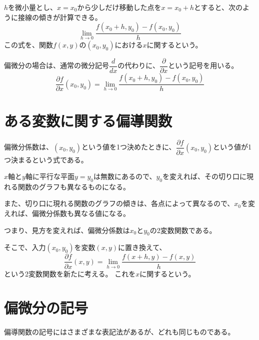 \documentclass[../../../topic_calculus]{subfiles}
\begin{document}
\br

$h$を微小量とし、$x = x_0$から少しだけ移動した点を$x = x_0 + h$とすると、次のように接線の傾きが計算できる。
\begin{equation*}
  \lim_{h \to 0} \frac{f(x_0 + h, y_0) - f(x_0, y_0)}{h}
\end{equation*}
この式を、関数$f(x,y)$の$(x_0,y_0)$における$x$に関するという。

\br

偏微分の場合は、通常の微分記号$\dfrac{d}{dx}$の代わりに、$\dfrac{\partial}{\partial x}$という記号を用いる。
\begin{equation*}
  \dfrac{\partial f}{\partial x}(x_0,y_0) = \lim_{h \to 0} \frac{f(x_0 + h, y_0) - f(x_0, y_0)}{h}
\end{equation*}

\sectionline
\section{ある変数に関する偏導関数}

偏微分係数は、$(x_0,y_0)$という値を1つ決めたときに、$\dfrac{\partial f}{\partial x}(x_0,y_0)$という値が1つ決まるという式である。

\br

$x$軸と$y$軸に平行な平面$y=y_0$は無数にあるので、$y_0$を変えれば、その切り口に現れる関数のグラフも異なるものになる。

また、切り口に現れる関数のグラフの傾きは、各点によって異なるので、$x_0$を変えれば、偏微分係数も異なる値になる。

\br

つまり、見方を変えれば、偏微分係数は$x_0$と$y_0$の2変数関数である。

\br

そこで、入力$(x_0,y_0)$を変数$(x,y)$に置き換えて、
\begin{equation*}
  \dfrac{\partial f}{\partial x}(x,y) = \lim_{h \to 0} \frac{f(x + h, y) - f(x, y)}{h}
\end{equation*}
という2変数関数を新たに考える。
これを$x$に関するという。

\sectionline
\section{偏微分の記号}

偏導関数の記号にはさまざまな表記法があるが、どれも同じものである。
\end{document}

